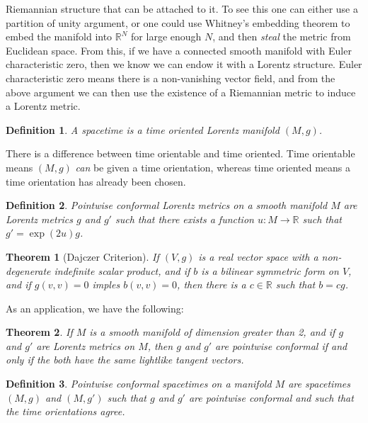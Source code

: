 \documentclass{article}
\theoremstyle{plain}
\newtheorem{theorem}{Theorem}[section]
\theoremstyle{thmit}
\theoremstyle{normal}
\newtheorem{definition}{Definition}[section]
\begin{document}
        Riemannian structure that can be attached to it. To see this one can
        either use a partition of unity argument, or one could use Whitney's
        embedding theorem to embed the manifold into $\mathbb{R}^{N}$ for large
        enough $N$, and then \textit{steal} the metric from Euclidean space.
        From this, if we have a connected smooth manifold with Euler
        characteristic zero, then we know we can endow it with a Lorentz
        structure. Euler characteristic zero means there is a non-vanishing
        vector field, and from the above argument we can then use the existence
        of a Riemannian metric to induce a Lorentz metric.
        \begin{definition}
            A spacetime is a time oriented Lorentz manifold $(M,g)$.
        \end{definition}
        There is a difference between time orientable and time oriented.
        Time orientable means $(M,g)$ \textit{can} be given a time orientation,
        whereas time oriented means a time orientation has already been chosen.
        \begin{definition}
            Pointwise conformal Lorentz metrics on a smooth manifold $M$ are
            Lorentz metrics $g$ and $g'$ such that there exists a function
            $u:M\rightarrow\mathbb{R}$ such that $g'=\exp(2u)g$.
        \end{definition}
        \begin{theorem}[Dajczer Criterion]
            If $(V,g)$ is a real vector space with a non-degenerate indefinite
            scalar product, and if $b$ is a bilinear symmetric form on $V$, and
            if $g(v,v)=0$ imples $b(v,v)=0$, then there is a $c\in\mathbb{R}$
            such that $b=cg$.
        \end{theorem}
        As an application, we have the following:
        \begin{theorem}
            If $M$ is a smooth manifold of dimension greater than 2, and if
            $g$ and $g'$ are Lorentz metrics on $M$, then $g$ and $g'$ are
            pointwise conformal if and only if the both have the same lightlike
            tangent vectors.
        \end{theorem}
        \begin{definition}
            Pointwise conformal spacetimes on a manifold $M$ are spacetimes
            $(M,g)$ and $(M,g')$ such that $g$ and $g'$ are pointwise conformal
            and such that the time orientations agree.
        \end{definition}
\end{document}
